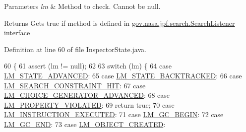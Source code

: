 \begin{DoxyParams}{Parameters}
{\em lm} & Method to check. Cannot be null. \\
\hline
\end{DoxyParams}
\begin{DoxyReturn}{Returns}
Gets true if method is defined in \hyperlink{}{gov.\+nasa.\+jpf.\+search.\+Search\+Listener} interface 
\end{DoxyReturn}


Definition at line 60 of file Inspector\+State.\+java.


\begin{DoxyCode}
60                                                                      \{
61       assert (lm != null);
62 
63       \textcolor{keywordflow}{switch} (lm) \{
64       \textcolor{keywordflow}{case} \hyperlink{enumgov_1_1nasa_1_1jpf_1_1inspector_1_1server_1_1expression_1_1_inspector_state_1_1_listener_method_a053a35f045147e0f3a5eb8f7fde5eb4a}{LM\_STATE\_ADVANCED}:
65       \textcolor{keywordflow}{case} \hyperlink{enumgov_1_1nasa_1_1jpf_1_1inspector_1_1server_1_1expression_1_1_inspector_state_1_1_listener_method_a38ea38848157ad8558c5324178d2500a}{LM\_STATE\_BACKTRACKED}:
66       \textcolor{keywordflow}{case} \hyperlink{enumgov_1_1nasa_1_1jpf_1_1inspector_1_1server_1_1expression_1_1_inspector_state_1_1_listener_method_abbaeb62205165889b058046e67218a50}{LM\_SEARCH\_CONSTRAINT\_HIT}:
67       \textcolor{keywordflow}{case} \hyperlink{enumgov_1_1nasa_1_1jpf_1_1inspector_1_1server_1_1expression_1_1_inspector_state_1_1_listener_method_a747308b791f73b2fe2be6bb7365d3848}{LM\_CHOICE\_GENERATOR\_ADVANCED}:
68       \textcolor{keywordflow}{case} \hyperlink{enumgov_1_1nasa_1_1jpf_1_1inspector_1_1server_1_1expression_1_1_inspector_state_1_1_listener_method_ac5acc74b8ec1efad9b1ede7db75122ec}{LM\_PROPERTY\_VIOLATED}:
69         \textcolor{keywordflow}{return} \textcolor{keyword}{true};
70       \textcolor{keywordflow}{case} \hyperlink{enumgov_1_1nasa_1_1jpf_1_1inspector_1_1server_1_1expression_1_1_inspector_state_1_1_listener_method_a36dd48aefdd2789f275a9dc9818d2a19}{LM\_INSTRUCTION\_EXECUTED}:
71       \textcolor{keywordflow}{case} \hyperlink{enumgov_1_1nasa_1_1jpf_1_1inspector_1_1server_1_1expression_1_1_inspector_state_1_1_listener_method_aac061a8517c319931188f51c304b92d3}{LM\_GC\_BEGIN}:
72       \textcolor{keywordflow}{case} \hyperlink{enumgov_1_1nasa_1_1jpf_1_1inspector_1_1server_1_1expression_1_1_inspector_state_1_1_listener_method_aeb7496302fb1f45a4ef15cc76da0c650}{LM\_GC\_END}:
73       \textcolor{keywordflow}{case} \hyperlink{enumgov_1_1nasa_1_1jpf_1_1inspector_1_1server_1_1expression_1_1_inspector_state_1_1_listener_method_aed018e03ea1cb7ea273f8f6a6aad49ae}{LM\_OBJECT\_CREATED}:

\end{DoxyCode}
